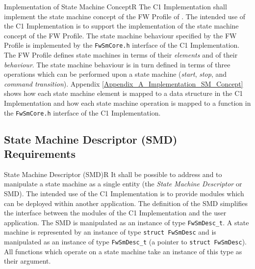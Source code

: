 \documentclass[a4paper,10pt]{article}
\newenvironment{fw_req}[6]
{\addtocounter{subsubsection}{1}
	\hspace{0.2cm}\textbf{FW-\arabic{section}.\arabic{subsection}.\arabic{subsubsection}/#2
	\hspace{0.8cm} #1}
	\vspace{-10pt}
\begin{longtable}{p{2.7cm}P{8.5cm}}
\hline
\textsc{Requirement} & #3 \\
\textsc{Justification} & #4 \\
\textsc{Implementation} & #5  \\ 
\textsc{Verification} & #6  \\
\hline
}
{\end{longtable}}
\begin{document}
\begin{fw_req}{Implementation of State Machine Concept}{R}
{The C1 Implementation shall implement the state machine concept of the FW Profile of \cite{ref:fwprofile}.}
{The intended use of the C1 Implementation is to support the implementation of the state machine concept of the FW Profile.}
{The state machine behaviour specified by the FW Profile is implemented 
by the \texttt{FwSmCore.h} interface of the C1 Implementation.} 
{The FW Profile defines state machines in terms of their \emph{elements} 
and of their \emph{behaviour}. 
The state machine behaviour is in turn defined in terms of three operations which can be performed 
upon a state machine (\textit{start}, \textit{stop}, and \textit{command transition}).
Appendix \ref{Appendix_A_Implementation_SM_Concept} shows how each state machine element is 
mapped to a data structure in the C1 Implementation and how each state machine operation is 
mapped to a function in the \texttt{FwSmCore.h} interface of the C1 Implementation.}
\end{fw_req}

\subsection{State Machine Descriptor (SMD) Requirements}\label{req:SMD}

\begin{fw_req}{State Machine Descriptor (SMD)}{R}
{It shall be possible to address and to manipulate a state machine 
as a single entity (the \emph{State Machine Descriptor} or SMD).}
{The intended use of the C1 Implementation is to provide modules 
which can be deployed within another application. 
The definition of the SMD simplifies the interface between the modules of the C1 Implementation 
and the user application.}
{The SMD is manipulated as an instance of type \texttt{FwSmDesc\_t}.} 
{A state machine is represented by an instance of type 
\texttt{struct FwSmDesc} and is manipulated as an instance of type 
\texttt{FwSmDesc\_t} (a pointer to \texttt{struct FwSmDesc}).
All functions which operate on a state machine take an instance of this type as their argument.}
\end{fw_req}
\end{document}
